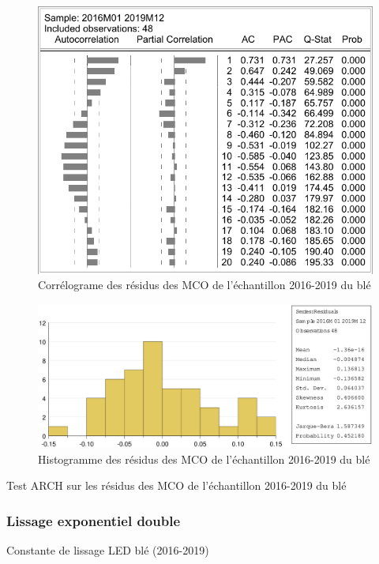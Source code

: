 \documentclass[12pt,a4paper]{article}
\begin{document}
\begin{figure}[H]
    \centering
    \label{fig:extra_cor_ble19}
    \includegraphics[]{annexe/3_1_extra_cor_ble19.pdf}
    \caption{Corrélograme des résidus des MCO de l'échantillon 2016-2019 du blé}
\end{figure}

\begin{figure}[H]
    \centering
    \includegraphics[width=\textwidth]{annexe/3_1_extra_hist_ble19.eps}
    \caption{Histogramme des résidus des MCO de l'échantillon 2016-2019 du blé}
    \label{fig:extra_hist_ble19}
\end{figure}

\begin{table}[H]
    \centering
    \caption{Test ARCH sur les résidus des MCO de l'échantillon 2016-2019 du blé}
    \sffamily
    
    \label{tab:extra_arch_ble19}
\end{table}

\subsubsection{Lissage exponentiel double}
\begin{table}[H]
    \centering
    \caption{Constante de lissage LED blé (2016-2019)}
    \sffamily
    
    \label{tab:led_ble19}
\end{table}
\end{document}
